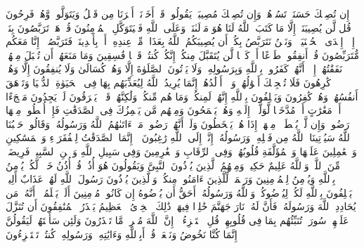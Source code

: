 إِن تُصِبۡكَ حَسَنَةࣱ تَسُؤۡهُمۡۖ وَإِن تُصِبۡكَ مُصِیبَةࣱ یَقُولُوا۟ قَدۡ أَخَذۡنَاۤ أَمۡرَنَا مِن قَبۡلُ وَیَتَوَلَّوا۟ وَّهُمۡ فَرِحُونَ%
\stopbuffer
\startbuffer[\q:9:51]
قُل لَّن یُصِیبَنَاۤ إِلَّا مَا كَتَبَ ٱللَّهُ لَنَا هُوَ مَوۡلَىٰنَاۚ وَعَلَى ٱللَّهِ فَلۡیَتَوَكَّلِ ٱلۡمُؤۡمِنُونَ%
\stopbuffer
\startbuffer[\q:9:52]
قُلۡ هَلۡ تَرَبَّصُونَ بِنَاۤ إِلَّاۤ إِحۡدَى ٱلۡحُسۡنَیَیۡنِۖ وَنَحۡنُ نَتَرَبَّصُ بِكُمۡ أَن یُصِیبَكُمُ ٱللَّهُ بِعَذَابࣲ مِّنۡ عِندِهِۦۤ أَوۡ بِأَیۡدِینَاۖ فَتَرَبَّصُوۤا۟ إِنَّا مَعَكُم مُّتَرَبِّصُونَ%
\stopbuffer
\startbuffer[\q:9:53]
قُلۡ أَنفِقُوا۟ طَوۡعًا أَوۡ كَرۡهࣰا لَّن یُتَقَبَّلَ مِنكُمۡ إِنَّكُمۡ كُنتُمۡ قَوۡمࣰا فَٰسِقِینَ%
\stopbuffer
\startbuffer[\q:9:54]
وَمَا مَنَعَهُمۡ أَن تُقۡبَلَ مِنۡهُمۡ نَفَقَٰتُهُمۡ إِلَّاۤ أَنَّهُمۡ كَفَرُوا۟ بِٱللَّهِ وَبِرَسُولِهِۦ وَلَا یَأۡتُونَ ٱلصَّلَوٰةَ إِلَّا وَهُمۡ كُسَالَىٰ وَلَا یُنفِقُونَ إِلَّا وَهُمۡ كَٰرِهُونَ%
\stopbuffer
\startbuffer[\q:9:55]
فَلَا تُعۡجِبۡكَ أَمۡوَٰلُهُمۡ وَلَاۤ أَوۡلَٰدُهُمۡۚ إِنَّمَا یُرِیدُ ٱللَّهُ لِیُعَذِّبَهُم بِهَا فِی ٱلۡحَیَوٰةِ ٱلدُّنۡیَا وَتَزۡهَقَ أَنفُسُهُمۡ وَهُمۡ كَٰفِرُونَ%
\stopbuffer
\startbuffer[\q:9:56]
وَیَحۡلِفُونَ بِٱللَّهِ إِنَّهُمۡ لَمِنكُمۡ وَمَا هُم مِّنكُمۡ وَلَٰكِنَّهُمۡ قَوۡمࣱ یَفۡرَقُونَ%
\stopbuffer
\startbuffer[\q:9:57]
لَوۡ یَجِدُونَ مَلۡجَءًا أَوۡ مَغَٰرَٰتٍ أَوۡ مُدَّخَلࣰا لَّوَلَّوۡا۟ إِلَیۡهِ وَهُمۡ یَجۡمَحُونَ%
\stopbuffer
\startbuffer[\q:9:58]
وَمِنۡهُم مَّن یَلۡمِزُكَ فِی ٱلصَّدَقَٰتِ فَإِنۡ أُعۡطُوا۟ مِنۡهَا رَضُوا۟ وَإِن لَّمۡ یُعۡطَوۡا۟ مِنۡهَاۤ إِذَا هُمۡ یَسۡخَطُونَ%
\stopbuffer
\startbuffer[\q:9:59]
وَلَوۡ أَنَّهُمۡ رَضُوا۟ مَاۤ ءَاتَىٰهُمُ ٱللَّهُ وَرَسُولُهُۥ وَقَالُوا۟ حَسۡبُنَا ٱللَّهُ سَیُؤۡتِینَا ٱللَّهُ مِن فَضۡلِهِۦ وَرَسُولُهُۥۤ إِنَّاۤ إِلَى ٱللَّهِ رَٰغِبُونَ%
\stopbuffer
\startbuffer[\q:9:60]
۞ إِنَّمَا ٱلصَّدَقَٰتُ لِلۡفُقَرَاۤءِ وَٱلۡمَسَٰكِینِ وَٱلۡعَٰمِلِینَ عَلَیۡهَا وَٱلۡمُؤَلَّفَةِ قُلُوبُهُمۡ وَفِی ٱلرِّقَابِ وَٱلۡغَٰرِمِینَ وَفِی سَبِیلِ ٱللَّهِ وَٱبۡنِ ٱلسَّبِیلِۖ فَرِیضَةࣰ مِّنَ ٱللَّهِۗ وَٱللَّهُ عَلِیمٌ حَكِیمࣱ%
\stopbuffer
\startbuffer[\q:9:61]
وَمِنۡهُمُ ٱلَّذِینَ یُؤۡذُونَ ٱلنَّبِیَّ وَیَقُولُونَ هُوَ أُذُنࣱۚ قُلۡ أُذُنُ خَیۡرࣲ لَّكُمۡ یُؤۡمِنُ بِٱللَّهِ وَیُؤۡمِنُ لِلۡمُؤۡمِنِینَ وَرَحۡمَةࣱ لِّلَّذِینَ ءَامَنُوا۟ مِنكُمۡۚ وَٱلَّذِینَ یُؤۡذُونَ رَسُولَ ٱللَّهِ لَهُمۡ عَذَابٌ أَلِیمࣱ%
\stopbuffer
\startbuffer[\q:9:62]
یَحۡلِفُونَ بِٱللَّهِ لَكُمۡ لِیُرۡضُوكُمۡ وَٱللَّهُ وَرَسُولُهُۥۤ أَحَقُّ أَن یُرۡضُوهُ إِن كَانُوا۟ مُؤۡمِنِینَ%
\stopbuffer
\startbuffer[\q:9:63]
أَلَمۡ یَعۡلَمُوۤا۟ أَنَّهُۥ مَن یُحَادِدِ ٱللَّهَ وَرَسُولَهُۥ فَأَنَّ لَهُۥ نَارَ جَهَنَّمَ خَٰلِدࣰا فِیهَاۚ ذَٰلِكَ ٱلۡخِزۡیُ ٱلۡعَظِیمُ%
\stopbuffer
\startbuffer[\q:9:64]
یَحۡذَرُ ٱلۡمُنَٰفِقُونَ أَن تُنَزَّلَ عَلَیۡهِمۡ سُورَةࣱ تُنَبِّئُهُم بِمَا فِی قُلُوبِهِمۡۚ قُلِ ٱسۡتَهۡزِءُوۤا۟ إِنَّ ٱللَّهَ مُخۡرِجࣱ مَّا تَحۡذَرُونَ%
\stopbuffer
\startbuffer[\q:9:65]
وَلَئِن سَأَلۡتَهُمۡ لَیَقُولُنَّ إِنَّمَا كُنَّا نَخُوضُ وَنَلۡعَبُۚ قُلۡ أَبِٱللَّهِ وَءَایَٰتِهِۦ وَرَسُولِهِۦ كُنتُمۡ تَسۡتَهۡزِءُونَ%
\stopbuffer
